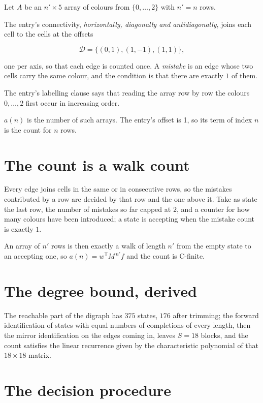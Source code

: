 \documentclass[11pt]{article}
\theoremstyle{definition}
\begin{document}
Let $A$ be an $n' \times 5$ array of colours from $\{0,\dots,2\}$ with $n' = n$ rows.

The entry's connectivity, {\itshape horizontally, diagonally and antidiagonally}, joins each cell to the cells at the offsets

\[\mathcal{D} = \{(0,1), (1,-1), (1,1)\},\]

one per axis, so that each edge is counted once. A {\itshape mistake} is an edge whose two cells carry the same colour, and the condition is that there are exactly $1$ of them.

The entry's labelling clause says that reading the array row by row the colours $0,\dots,2$ first occur in increasing order.

$a(n)$ is the number of such arrays. The entry's offset is 1, so its term of index $n$ is the count for $n$ rows.

\section{The count is a walk count}

Every edge joins cells in the same or in consecutive rows, so the mistakes contributed by a row are decided by that row and the one above it. Take as state the last row, the number of mistakes so far capped at $2$, and a counter for how many colours have been introduced; a state is accepting when the mistake count is exactly $1$.

An array of $n'$ rows is then exactly a walk of length $n'$ from the empty state to an accepting one, so $a(n) = w^{\mathsf T}M^{\,n'}f$ and the count is C-finite.

\section{The degree bound, derived}

The reachable part of the digraph has $375$ states, $176$ after trimming; the forward identification of states with equal numbers of completions of every length, then the mirror identification on the edges coming in, leaves $S = 18$ blocks, and the count satisfies the linear recurrence given by the characteristic polynomial of that $18\times18$ matrix.

\section{The decision procedure}
\end{document}
